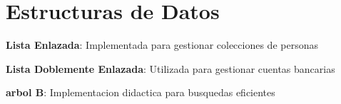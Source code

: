\chapter{Estructuras de Datos }
\hypertarget{estructuras}{}\label{estructuras}

\begin{DoxyItemize}
\item {\bfseries{Lista Enlazada}}\+: Implementada para gestionar colecciones de personas
\item {\bfseries{Lista Doblemente Enlazada}}\+: Utilizada para gestionar cuentas bancarias
\item {\bfseries{arbol B}}\+: Implementacion didactica para busquedas eficientes 
\end{DoxyItemize}